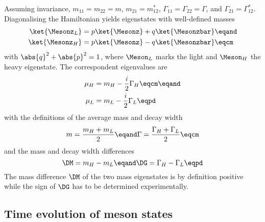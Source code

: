 Assuming \CPT invariance, $m_{11} = m_{22} = m$, $m_{21} = m_{12}^{\ast}$,
$\Gamma_{11} = \Gamma_{22} = \Gamma$, and $\Gamma_{21} = \Gamma_{12}^{\ast}$.
Diagonalising the Hamiltonian yields eigenstates with well-defined masses
%
\begin{equation}\label{eq:cpv_theory:flavour_physics:bmixing:mass_eigenstates}
  \begin{split}
    \ket{\Mesonz_L} &= p \ket{\Mesonz} + q \ket{\Mesonzbar}\eqand \\
    \ket{\Mesonz_H} &= p \ket{\Mesonz} - q \ket{\Mesonzbar}\eqcm
  \end{split}
\end{equation}
%
with $\abs{q}^2 + \abs{p}^2 = 1$, where $\Meson_L$ marks the light and
$\Meson_H$ the heavy eigenstate. The correspondent eigenvalues are
%
\begin{equation}
  \begin{split}
    \mu_H &= m_H - \frac{i}{2} \Gamma_H\eqcm\eqand \\
    \mu_L &= m_L - \frac{i}{2} \Gamma_L\eqpd
  \end{split}
\end{equation}
%
with the definitions of the average mass and decay width
%
\begin{equation}
  m = \frac{m_H + m_L}{2} \eqand \Gamma = \frac{\Gamma_H + \Gamma_L}{2}\eqcm
\end{equation}
%
and the mass and decay width differences
%
\begin{equation}
  \DM = m_H - m_L \eqand \DG = \Gamma_H - \Gamma_L\eqpd
\end{equation}
%
The mass difference $\DM$ of the two mass eigenstates is by definition positive
while the sign of $\DG$ has to be determined experimentally.
%
%


\subsection{Time evolution of meson states}
\label{sec:cpv_theory:flavour_physics:time_evolution}


